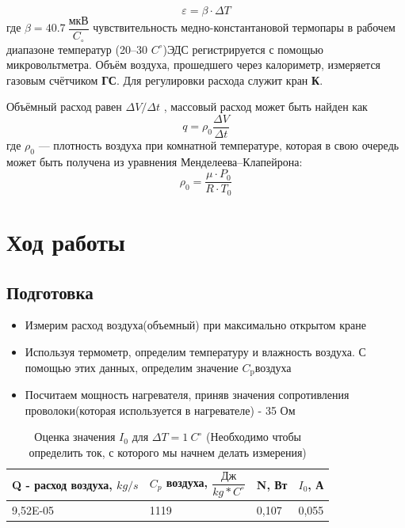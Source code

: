 \documentclass[a4paper,12pt]{article}
\theoremstyle{plain} %
\theoremstyle{definition} %
\theoremstyle{remark} %
\begin{document}
\begin{equation}
\varepsilon = \beta \cdot \Delta T
\end{equation}
где $\beta  = 40.7 \  \dfrac{\text{мкВ}}{C_\circ }$ чувствительность медно-константановой термопары в рабочем диапазоне температур (20–30 $C^\circ$)ЭДС регистрируется с помощью микровольтметра. Объём воздуха, прошедшего через калориметр, измеряется газовым счётчиком \textbf{ГС}. Для регулировки расхода служит кран \textbf{К}.

Объёмный расход равен $\Delta V/\Delta t$ , массовый расход может быть найден как
\begin{equation}
q = \rho_0 \dfrac{\Delta V}{\Delta t}
\end{equation}
где $\rho_0$ — плотность воздуха при комнатной температуре, которая в свою очередь может быть получена из уравнения Менделеева–Клапейрона:
\[ \rho_0 = \dfrac{\mu \cdot P_0}{R \cdot T_0}\]

\section{Ход работы}

\subsection{Подготовка}

\begin{itemize}
\item Измерим расход воздуха(объемный) при максимально открытом кране
\item Используя термометр, определим температуру и влажность воздуха. С помощью этих данных, определим значение $C_{\text{p}} \text{воздуха}$ 
\item Посчитаем мощность нагревателя, приняв значения сопротивления проволоки(которая используется в нагревателе) - 35 Ом
\end{itemize}

\begin{table}[H]
\centering
\caption{Оценка значения $ I_0 $ для $\Delta T = 1 \ C^\circ $ (Необходимо чтобы определить ток, с которого мы начнем делать измерения)}

\label{tab:tab1}
\begin{tabular}{|l|l|l|l|}
\hline
Q - расход воздуха, $kg/s$ & $C_p$ воздуха, $\dfrac{\text{Дж}}{kg * C^\circ} $ & N, Вт    & $I_0$, А     \\ \hline
9,52E-05               & 1119                                       & 0,107 & 0,055 \\ \hline
\end{tabular}
\end{table}
\end{document}
